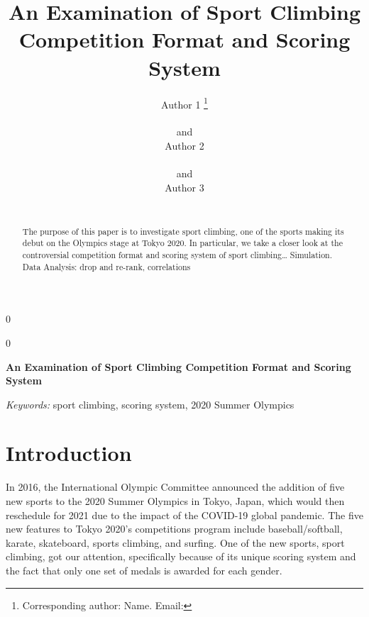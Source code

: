 \documentclass[12pt]{article}
\newcommand{\blind}{0}
\begin{document}
\def\spacingset#1{\renewcommand{\baselinestretch}%
{#1}\small\normalsize} \spacingset{1}



\blind
{
  \title{\bf An Examination of Sport Climbing Competition Format and
Scoring System}

  \author{
        Author 1 \thanks{Corresponding author: Name. Email:} \\
    \\
     and \\     Author 2 \\
    \\
     and \\     Author 3 \\
    \\
      }
  \maketitle
} \fi

\blind
{
  \bigskip
  \bigskip
  \bigskip
  \begin{center}
    {\LARGE\bf An Examination of Sport Climbing Competition Format and
Scoring System}
  \end{center}
  \medskip
} \fi

\bigskip
\begin{abstract}
The purpose of this paper is to investigate sport climbing, one of the
sports making its debut on the Olympics stage at Tokyo 2020. In
particular, we take a closer look at the controversial competition
format and scoring system of sport climbing\ldots{} Simulation. Data
Analysis: drop and re-rank, correlations
\end{abstract}

\noindent%
{\it Keywords:} sport climbing, scoring system, 2020 Summer Olympics
\vfill

\newpage
\spacingset{1.45} %

\hypertarget{introduction}{%
\section{Introduction}\label{introduction}}

In 2016, the International Olympic Committee announced the addition of
five new sports to the 2020 Summer Olympics in Tokyo, Japan, which would
then reschedule for 2021 due to the impact of the COVID-19 global
pandemic. The five new features to Tokyo 2020's competitions program
include baseball/softball, karate, skateboard, sports climbing, and
surfing. One of the new sports, sport climbing, got our attention,
specifically because of its unique scoring system and the fact that only
one set of medals is awarded for each gender.
\end{document}
